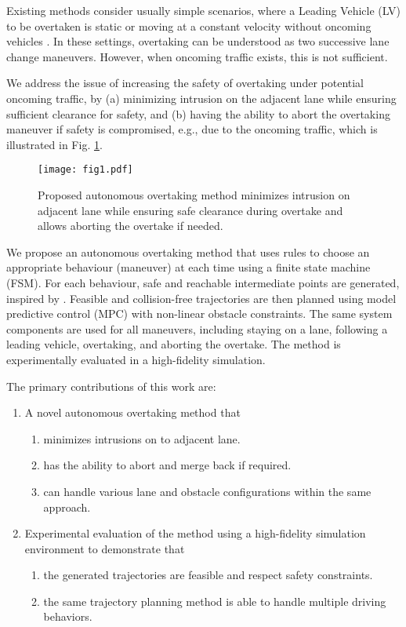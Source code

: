\documentclass[letterpaper, 10 pt, conference]{ieeeconf}
\begin{document}
Existing methods consider usually simple scenarios, where a Leading Vehicle (LV) to be overtaken is static or moving at a constant velocity without oncoming vehicles \cite{dixitTrajectoryPlanningTracking2018}. In these settings, overtaking can be understood as two successive lane change maneuvers. However, when oncoming traffic exists, this is not sufficient.   

We address the issue of increasing the safety of overtaking under potential oncoming traffic, by (a) minimizing intrusion on the adjacent lane while ensuring sufficient clearance for safety, and (b) having the ability to abort the overtaking maneuver if safety is compromised, e.g., due to the oncoming traffic, which is illustrated in Fig. \ref{intermediaterefselection}.

\begin{figure}[!t]
    \centering
    \texttt{[image: fig1.pdf]}
    \caption{Proposed autonomous overtaking method minimizes intrusion on adjacent lane while ensuring safe clearance during overtake and allows aborting the overtake if needed. 
    \label{intermediaterefselection}}
\end{figure}

We propose an autonomous overtaking method that uses rules to choose an appropriate behaviour (maneuver) at each time using a finite state machine (FSM). 
For each behaviour, safe and reachable intermediate points are generated, inspired by \cite{dixitTrajectoryPlanningTracking2018}. 
Feasible and collision-free trajectories are then planned using model predictive control (MPC) with non-linear obstacle constraints. 
The same system components are used for all maneuvers, including staying on a lane, following a leading vehicle, overtaking, and aborting the overtake.
The method is experimentally evaluated in a high-fidelity simulation.  

The primary contributions of this work are:
\begin{enumerate}
    \item A novel autonomous overtaking method that
    \begin{enumerate}
        \item minimizes intrusions on to adjacent lane.
        \item has the ability to abort and merge back if required.
        \item can handle various lane and obstacle configurations within the same approach.
    \end{enumerate}
    \item Experimental evaluation of the method using a high-fidelity simulation environment to demonstrate that
    \begin{enumerate}
        \item the generated trajectories are feasible and respect safety constraints.
        \item the same trajectory planning method is able to handle multiple driving behaviors.
    \end{enumerate}
\end{enumerate}
\end{document}
